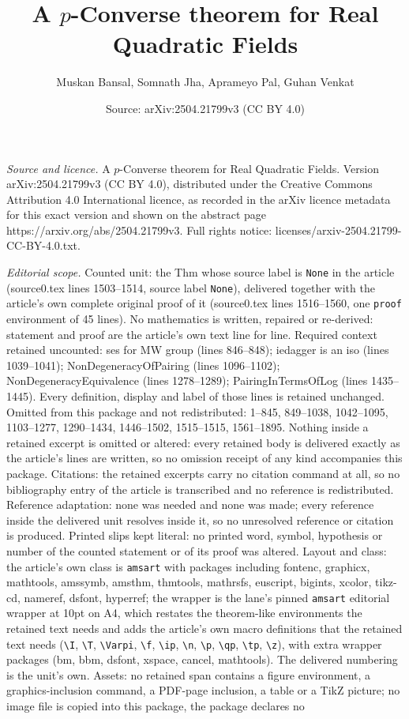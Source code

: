 \documentclass[10pt,a4paper]{amsart}
\title[A $p$-Converse theorem for Real Quadratic Fields]{A $p$-Converse theorem for Real Quadratic Fields}
\author{Muskan Bansal, Somnath Jha, Aprameyo Pal, Guhan Venkat}
\date{Source: arXiv:2504.21799v3 (CC BY 4.0)}
\begin{document}
\maketitle

\noindent\emph{Source and licence.} A $p$-Converse theorem for Real Quadratic Fields. Version arXiv:2504.21799v3 (CC BY 4.0), distributed under the Creative Commons Attribution 4.0 International licence, as recorded in the arXiv licence metadata for this exact version and shown on the abstract page https://arxiv.org/abs/2504.21799v3. Full rights notice: licenses/arxiv-2504.21799-CC-BY-4.0.txt.\par\smallskip

\noindent\textit{Editorial scope.} Counted unit: the Thm whose source label is \texttt{None} in the article (source0.tex lines 1503--1514, source label \texttt{None}), delivered together with the article's own complete original proof of it (source0.tex lines 1516--1560, one \texttt{proof} environment of 45 lines). No mathematics is written, repaired or re-derived: statement and proof are the article's own text line for line. Required context retained uncounted: ses for MW group (lines 846--848); iedagger is an iso (lines 1039--1041); NonDegeneracyOfPairing (lines 1096--1102); NonDegeneracyEquivalence (lines 1278--1289); PairingInTermsOfLog (lines 1435--1445). Every definition, display and label of those lines is retained unchanged. Omitted from this package and not redistributed: 1--845, 849--1038, 1042--1095, 1103--1277, 1290--1434, 1446--1502, 1515--1515, 1561--1895. Nothing inside a retained excerpt is omitted or altered: every retained body is delivered exactly as the article's lines are written, so no omission receipt of any kind accompanies this package. Citations: the retained excerpts carry no citation command at all, so no bibliography entry of the article is transcribed and no reference is redistributed. Reference adaptation: none was needed and none was made; every reference inside the delivered unit resolves inside it, so no unresolved reference or citation is produced. Printed slips kept literal: no printed word, symbol, hypothesis or number of the counted statement or of its proof was altered. Layout and class: the article's own class is \texttt{amsart} with packages including fontenc, graphicx, mathtools, amssymb, amsthm, thmtools, mathrsfs, euscript, bigints, xcolor, tikz-cd, nameref, dsfont, hyperref; the wrapper is the lane's pinned \texttt{amsart} editorial wrapper at 10pt on A4, which restates the theorem-like environments the retained text needs and adds the article's own macro definitions that the retained text needs (\texttt{\textbackslash I}, \texttt{\textbackslash T}, \texttt{\textbackslash Varpi}, \texttt{\textbackslash f}, \texttt{\textbackslash ip}, \texttt{\textbackslash n}, \texttt{\textbackslash p}, \texttt{\textbackslash qp}, \texttt{\textbackslash tp}, \texttt{\textbackslash z}), with extra wrapper packages (bm, bbm, dsfont, xspace, cancel, mathtools). The delivered numbering is the unit's own. Assets: no retained span contains a figure environment, a graphics-inclusion command, a PDF-page inclusion, a table or a TikZ picture; no image file is copied into this package, the package declares no 
\end{document}
